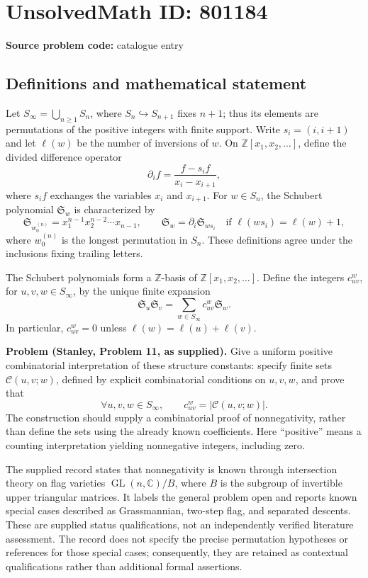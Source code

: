 \documentclass[11pt]{article}
\newcommand{\Z}{\mathbb{Z}}
\newcommand{\C}{\mathbb{C}}
\begin{document}
\section*{UnsolvedMath ID: 801184}
\textbf{Source problem code:} catalogue entry
\subsection{Definitions and mathematical statement}
Let \(S_\infty=\bigcup_{n\geq 1}S_n\), where \(S_n\hookrightarrow S_{n+1}\) fixes \(n+1\); thus its elements are permutations of the positive integers with finite support. Write \(s_i=(i,i+1)\) and let \(\ell(w)\) be the number of inversions of \(w\). On \(\Z[x_1,x_2,\ldots]\), define the divided difference operator
\[
\partial_i f=\frac{f-s_i f}{x_i-x_{i+1}},
\]
where \(s_i f\) exchanges the variables \(x_i\) and \(x_{i+1}\). For \(w\in S_n\), the Schubert polynomial \(\mathfrak S_w\) is characterized by
\[
\mathfrak S_{w_0^{(n)}}=x_1^{n-1}x_2^{n-2}\cdots x_{n-1},\qquad
\mathfrak S_w=\partial_i\mathfrak S_{ws_i}
\quad\text{if }\ell(ws_i)=\ell(w)+1,
\]
where \(w_0^{(n)}\) is the longest permutation in \(S_n\). These definitions agree under the inclusions fixing trailing letters.

The Schubert polynomials form a \(\Z\)-basis of \(\Z[x_1,x_2,\ldots]\). Define the integers \(c_{uv}^{w}\), for \(u,v,w\in S_\infty\), by the unique finite expansion
\[
\mathfrak S_u\mathfrak S_v
=\sum_{w\in S_\infty}c_{uv}^{w}\mathfrak S_w.
\]
In particular, \(c_{uv}^{w}=0\) unless \(\ell(w)=\ell(u)+\ell(v)\).

\textbf{Problem (Stanley, Problem 11, as supplied).} Give a uniform positive combinatorial interpretation of these structure constants: specify finite sets \(\mathcal C(u,v;w)\), defined by explicit combinatorial conditions on \(u,v,w\), and prove that
\[
\forall u,v,w\in S_\infty,\qquad
c_{uv}^{w}=\lvert\mathcal C(u,v;w)\rvert.
\]
The construction should supply a combinatorial proof of nonnegativity, rather than define the sets using the already known coefficients. Here ``positive'' means a counting interpretation yielding nonnegative integers, including zero.

The supplied record states that nonnegativity is known through intersection theory on flag varieties \(\operatorname{GL}(n,\C)/B\), where \(B\) is the subgroup of invertible upper triangular matrices. It labels the general problem open and reports known special cases described as Grassmannian, two-step flag, and separated descents. These are supplied status qualifications, not an independently verified literature assessment. The record does not specify the precise permutation hypotheses or references for those special cases; consequently, they are retained as contextual qualifications rather than additional formal assertions.
\end{document}
